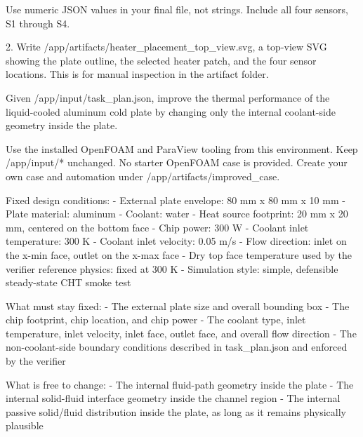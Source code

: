 \documentclass{llmxive}
\begin{document}
\begin{instructionbox}
Use numeric JSON values in your final file, not strings. Include all four sensors, \textasciigrave{}S1\textasciigrave{} through \textasciigrave{}S4\textasciigrave{}.

2. Write \textasciigrave{}/app/artifacts/heater\_placement\_top\_view.svg\textasciigrave{}, a top-view SVG showing the plate outline, the selected heater patch, and the four sensor locations. This is for manual inspection in the artifact folder.
\end{instructionbox}

\begin{instructionbox}
Given \textasciigrave{}/app/input/task\_plan.json\textasciigrave{}, improve the thermal performance of the liquid-cooled aluminum cold plate by changing only the internal coolant-side geometry inside the plate.

Use the installed OpenFOAM and ParaView tooling from this environment. Keep \textasciigrave{}/app/input/*\textasciigrave{} unchanged. No starter OpenFOAM case is provided. Create your own case and automation under \textasciigrave{}/app/artifacts/improved\_case\textasciigrave{}.

Fixed design conditions:
- External plate envelope: \textasciigrave{}80 mm x 80 mm x 10 mm\textasciigrave{}
- Plate material: aluminum
- Coolant: water
- Heat source footprint: \textasciigrave{}20 mm x 20 mm\textasciigrave{}, centered on the bottom face
- Chip power: \textasciigrave{}300 W\textasciigrave{}
- Coolant inlet temperature: \textasciigrave{}300 K\textasciigrave{}
- Coolant inlet velocity: \textasciigrave{}0.05 m/s\textasciigrave{}
- Flow direction: inlet on the \textasciigrave{}x-min\textasciigrave{} face, outlet on the \textasciigrave{}x-max\textasciigrave{} face
- Dry top face temperature used by the verifier reference physics: fixed at \textasciigrave{}300 K\textasciigrave{}
- Simulation style: simple, defensible steady-state CHT smoke test

What must stay fixed:
- The external plate size and overall bounding box
- The chip footprint, chip location, and chip power
- The coolant type, inlet temperature, inlet velocity, inlet face, outlet face, and overall flow direction
- The non-coolant-side boundary conditions described in \textasciigrave{}task\_plan.json\textasciigrave{} and enforced by the verifier

What is free to change:
- The internal fluid-path geometry inside the plate
- The internal solid-fluid interface geometry inside the channel region
- The internal passive solid/fluid distribution inside the plate, as long as it remains physically plausible


\end{instructionbox}
\end{document}
